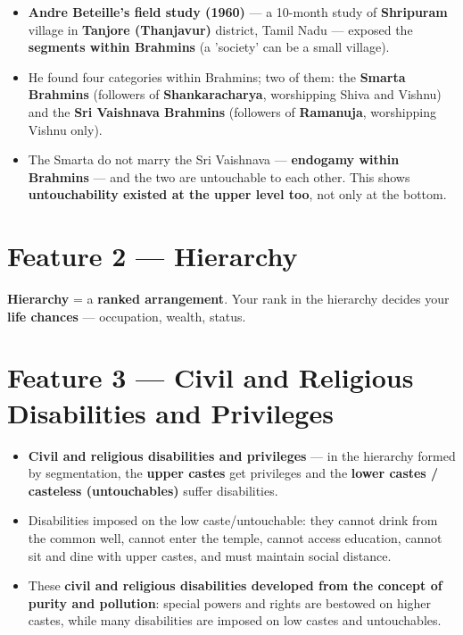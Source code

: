\begin{ExampleBox}
\begin{itemize}
\item \textbf{Andre Beteille's field study (1960)} --- a 10-month study of \textbf{Shripuram} village in \textbf{Tanjore (Thanjavur)} district, Tamil Nadu --- exposed the \textbf{segments within Brahmins} (a 'society' can be a small village).
\item He found four categories within Brahmins; two of them: the \textbf{Smarta Brahmins} (followers of \textbf{Shankaracharya}, worshipping Shiva and Vishnu) and the \textbf{Sri Vaishnava Brahmins} (followers of \textbf{Ramanuja}, worshipping Vishnu only).
\item The Smarta do not marry the Sri Vaishnava --- \textbf{endogamy within Brahmins} --- and the two are untouchable to each other. This shows \textbf{untouchability existed at the upper level too}, not only at the bottom.
\end{itemize}
\end{ExampleBox}

\section{Feature 2 --- Hierarchy}

\begin{KeyConcept}
\textbf{Hierarchy} = a \textbf{ranked arrangement}. Your rank in the hierarchy decides your \textbf{life chances} --- occupation, wealth, status.
\end{KeyConcept}

\section{Feature 3 --- Civil and Religious Disabilities and Privileges}

\begin{KeyConcept}
\begin{itemize}
\item \textbf{Civil and religious disabilities and privileges} --- in the hierarchy formed by segmentation, the \textbf{upper castes} get privileges and the \textbf{lower castes / casteless (untouchables)} suffer disabilities.
\item Disabilities imposed on the low caste/untouchable: they cannot drink from the common well, cannot enter the temple, cannot access education, cannot sit and dine with upper castes, and must maintain social distance.
\item These \textbf{civil and religious disabilities developed from the concept of purity and pollution}: special powers and rights are bestowed on higher castes, while many disabilities are imposed on low castes and untouchables.
\end{itemize}
\end{KeyConcept}

